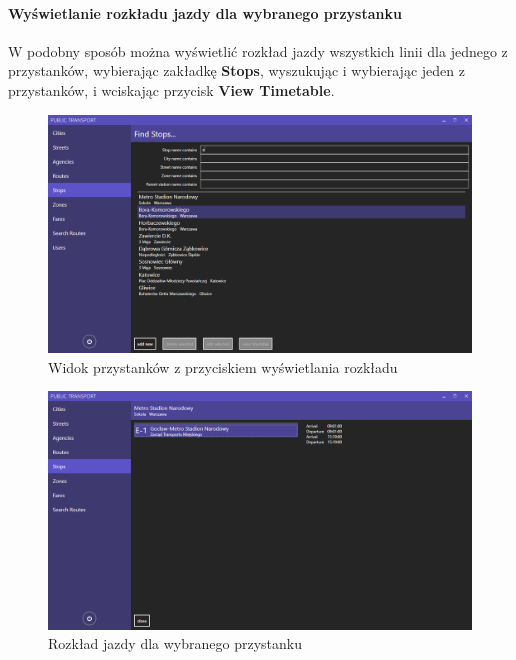 \documentclass[10pt,a4paper]{article}
\begin{document}
\paragraph{Wyświetlanie rozkładu jazdy dla wybranego przystanku}
W podobny sposób można wyświetlić rozkład jazdy wszystkich linii dla jednego z przystanków, wybierając zakładkę \textbf{Stops}, wyszukując i wybierając jeden z przystanków, i wciskając przycisk \textbf{View Timetable}.
\begin{figure}[H]
	\centering
	\includegraphics[width=15cm]{Resources/Images/13_filter_stops.png}
	\caption{Widok przystanków z przyciskiem wyświetlania rozkładu}
\end{figure}
\begin{figure}[H]
	\centering
	\includegraphics[width=15cm]{Resources/Images/22_stop_timetable.PNG}
	\caption{Rozkład jazdy dla wybranego przystanku}
\end{figure}
\end{document}
